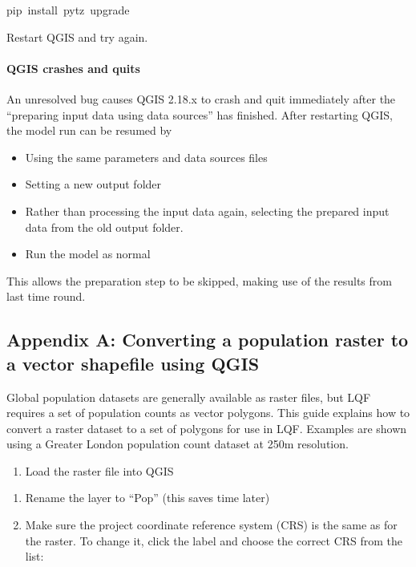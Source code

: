 \documentclass[letterpaper,10pt,english]{sphinxmanual}
\begin{document}
pip install pytz \textendash{}upgrade

Restart QGIS and try again.


\paragraph{QGIS crashes and quits}
\label{\detokenize{OtherManuals/LQF_Manual:qgis-crashes-and-quits}}
An unresolved bug causes QGIS 2.18.x to crash and quit immediately after
the “preparing input data using data sources” has finished. After
restarting QGIS, the model run can be resumed by
\begin{itemize}
\item {} 
Using the same parameters and data sources files

\item {} 
Setting a new output folder

\item {} 
Rather than processing the input data again, selecting the prepared
input data from the old output folder.

\item {} 
Run the model as normal

\end{itemize}

This allows the preparation step to be skipped, making use of the
results from last time round.


\subsection{Appendix A: Converting a population raster to a vector shapefile using QGIS}
\label{\detokenize{OtherManuals/LQF_Manual:appendix-a-converting-a-population-raster-to-a-vector-shapefile-using-qgis}}
Global population datasets are generally available as raster files, but
LQF requires a set of population counts as vector polygons. This guide
explains how to convert a raster dataset to a set of polygons for use in
LQF. Examples are shown using a Greater London population count dataset
at 250m resolution.
\begin{enumerate}
\item {} 
Load the raster file into QGIS

\end{enumerate}

\begin{figure}[htbp]
\centering
\capstart

\noindent{}
\caption{}\label{\detokenize{OtherManuals/LQF_Manual:id5}}\end{figure}
\begin{enumerate}
\item {} 
Rename the layer to “Pop” (this saves time later)

\item {} 
Make sure the project coordinate reference system (CRS) is the same
as for the raster. To change it, click the label and choose the
correct CRS from the list:

\end{enumerate}
\end{document}
